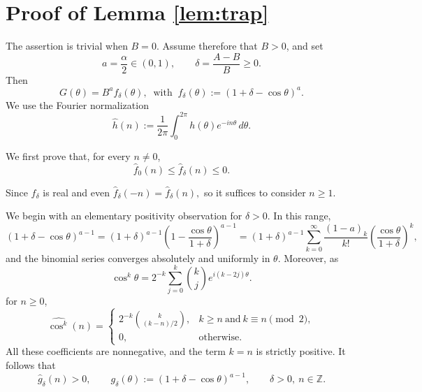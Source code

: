 \documentclass[11pt]{amsart}
\newtheorem{remark}[theorem]{Remark}
\begin{document}
\appendix




\section{Proof of Lemma \ref{lem:trap}}\label{appendix1}

The assertion is trivial when $B=0$. Assume therefore that $B>0$, and set
\[
    a=\frac{\alpha}{2}\in(0,1),
    \qquad
    \delta=\frac{A-B}{B}\geq 0.
\]
Then
\[
    G(\theta)=B^a f_\delta(\theta),
    \;\;\mbox{with}\;\;
    f_\delta(\theta):=(1+\delta-\cos\theta)^a.
\]
We use the Fourier normalization
\[
    \widehat h(n)
    :=
    \frac{1}{2\pi}\int_0^{2\pi}
    h(\theta)e^{-in\theta}\,d\theta.
\]

We first prove that, for every $n\neq 0$,
\begin{equation}\label{eq:monotone-fourier}
    \widehat f_0(n)
    \leq
    \widehat f_\delta(n)
    \leq 0.
\end{equation}

Since $f_\delta$ is real and even $\widehat f_\delta(-n)=\widehat f_\delta(n),$
so it suffices to consider $n\geq 1$.

We begin with an elementary positivity observation for $\delta>0$. In this range,
\begin{equation*}
    (1+\delta-\cos\theta)^{a-1}
    =(1+\delta)^{a-1}\left(1-\frac{\cos\theta}{1+\delta}\right)^{a-1}
    =(1+\delta)^{a-1}
      \sum_{k=0}^{\infty}
      \frac{(1-a)_k}{k!}  \left(\frac{\cos\theta}{1+\delta}\right)^k,
\end{equation*}
and the binomial series converges absolutely and uniformly in $\theta$. Moreover, as
\[
    \cos^k\theta
    =
    2^{-k}\sum_{j=0}^k
    \binom{k}{j}e^{i(k-2j)\theta}.
\]
for $n\geq0$,
\[
    \widehat{\cos^k}(n)
    =
    \begin{cases}
    \displaystyle
    2^{-k}\binom{k}{(k-n)/2},
        & k\geq n \ \text{and}\ k\equiv n \pmod 2,\\[2ex]
    0,  & \text{otherwise}.
    \end{cases}
\]
All these coefficients are nonnegative, and the term $k=n$ is strictly
positive. It follows that
\begin{equation*}%
    \widehat g_\delta(n)>0,
    \qquad
    g_\delta(\theta):=(1+\delta-\cos\theta)^{a-1},
    \qquad
    \delta>0,\ n\in\mathbb Z.
\end{equation*}
\end{document}
